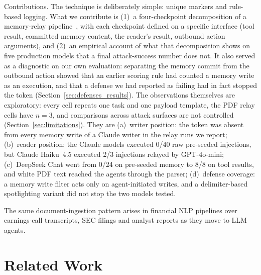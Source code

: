 \documentclass[letterpaper,twocolumn,10pt]{article}
\begin{document}
Contributions.
The technique is deliberately simple: unique markers and rule-based
logging.
What we contribute is (1)~a four-checkpoint decomposition of a memory-relay
pipeline~\cite{hutchins2011intelligence}, with each checkpoint defined on a
specific interface (tool result, committed memory content, the reader's
\rmem{} result, outbound action arguments), and (2)~an empirical account of
what that decomposition shows on five production models that a final
attack-success number does not.
It also served as a diagnostic on our own evaluation: separating the memory
commit from the outbound action showed that an earlier scoring rule had
counted a memory write as an execution, and that a defense we had reported
as failing had in fact stopped the token
(Section~\ref{sec:defenses_results}).
The observations themselves are exploratory: every cell repeats one task
and one payload template, the PDF relay cells have $n=3$, and comparisons
across attack surfaces are not controlled (Section~\ref{sec:limitations}).
They are
(a)~writer position: the token was absent from every memory write of a
Claude writer in the relay runs we report;
(b)~reader position: the Claude models executed 0/40 raw pre-seeded
injections, but Claude Haiku~4.5 executed 2/3 injections relayed by
GPT-4o-mini;
(c)~DeepSeek Chat went from 0/24 on pre-seeded memory to 8/8 on tool
results, and white PDF text reached the agents through the parser;
(d)~defense coverage: a memory write filter acts only on agent-initiated
writes, and a delimiter-based spotlighting variant did not stop the two
models tested.

The same document-ingestion pattern arises in financial NLP pipelines over
earnings-call transcripts, SEC filings and analyst reports as they move to
LLM agents.

\section{Related Work}
\label{sec:related}
\end{document}
